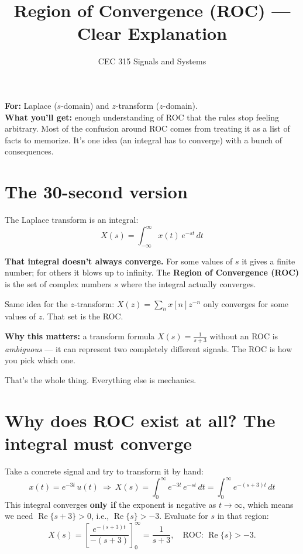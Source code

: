 \documentclass[11pt]{article}
\title{Region of Convergence (ROC) --- Clear Explanation}
\author{CEC 315 Signals and Systems}
\date{}
\begin{document}
\maketitle

\noindent\textbf{For:} Laplace ($s$-domain) and $z$-transform ($z$-domain).\\
\textbf{What you'll get:} enough understanding of ROC that the rules stop feeling arbitrary. Most of the confusion around ROC comes from treating it as a list of facts to memorize. It's one idea (an integral has to converge) with a bunch of consequences.

\tableofcontents
\newpage

\section{The 30-second version}

The Laplace transform is an integral:
\[
X(s) = \int_{-\infty}^{\infty} x(t)\, e^{-st}\, dt
\]

\textbf{That integral doesn't always converge.} For some values of $s$ it gives a finite number; for others it blows up to infinity. The \textbf{Region of Convergence (ROC)} is the set of complex numbers $s$ where the integral actually converges.

Same idea for the $z$-transform: $X(z) = \sum_n x[n] z^{-n}$ only converges for some values of $z$. That set is the ROC.

\textbf{Why this matters:} a transform formula $X(s) = \tfrac{1}{s+3}$ without an ROC is \emph{ambiguous} --- it can represent two completely different signals. The ROC is how you pick which one.

That's the whole thing. Everything else is mechanics.

\section{Why does ROC exist at all? The integral must converge}

Take a concrete signal and try to transform it by hand:
\[
x(t) = e^{-3t}\, u(t) \ \Rightarrow\ X(s) = \int_{0}^{\infty} e^{-3t}\, e^{-st}\, dt = \int_{0}^{\infty} e^{-(s+3)t}\, dt
\]
This integral converges \textbf{only if} the exponent is negative as $t \to \infty$, which means we need $\operatorname{Re}\{s+3\} > 0$, i.e., $\operatorname{Re}\{s\} > -3$. Evaluate for $s$ in that region:
\[
X(s) = \left[\frac{e^{-(s+3)t}}{-(s+3)}\right]_0^{\infty} = \frac{1}{s+3}, \quad \text{ROC: } \operatorname{Re}\{s\} > -3.
\]
\end{document}
